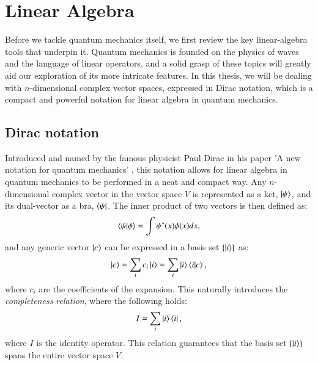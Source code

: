 \documentclass{subfiles}
\begin{document}
\section{Linear Algebra}
Before we tackle quantum mechanics itself, we first review the key linear-algebra tools that underpin it. Quantum mechanics is founded on the physics of waves and the language of linear operators, and a solid grasp of these topics will greatly aid our exploration of its more intricate features.
In this thesis, we will be dealing with $n$-dimensional complex vector spaces, expressed in Dirac notation, which is a compact and powerful notation for linear algebra in quantum mechanics.
\subsection{Dirac notation}
Introduced and named by the famous physicist Paul Dirac in his paper 'A new notation for quantum mechanics' \cite{dirac_1939}, this notation allows for linear algebra in quantum mechanics to be performed in a neat and compact way. Any $n$-dimensional complex vector in the vector space $V$ is represented as a ket, $\ket{\psi}$, and its dual-vector as a bra, $\bra{\psi}$. The inner product of two vectors is then defined as:
\begin{align*}
        \braket{\psi|\phi} = \int \psi^*(x)\phi(x) dx,
\end{align*} 
and any generic vector $\ket{c}$ can be expressed in a basis set $\{\ket{i}\}$ as:
\begin{align}
    \ket{c} = \sum_i c_i \ket{i} = \sum_i \ket{i}\braket{i|c}, 
\end{align}
where $c_i$ are the coefficients of the expansion. This naturally introduces the \emph{completeness relation}, where the following holds:
\begin{equation}
    I = \sum_i \ket{i}\bra{i}\label{eq:completeness_relation},
\end{equation}
where $I$ is the identity operator. This relation guarantees that the basis set $\{\ket{i}\}$ spans the entire vector space $V$.

\end{document}
